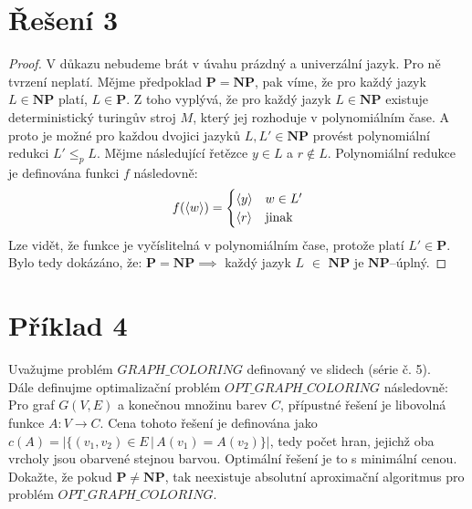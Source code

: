 \documentclass[a4paper, 11pt, fleqn]{scrartcl}
\begin{document}
 \section*{Řešení 3}
  \begin{proof}
    V důkazu nebudeme brát v úvahu prázdný a univerzální jazyk. Pro ně tvrzení neplatí. Mějme předpoklad $\mathbf{P} = \mathbf{NP}$, pak víme, že pro každý jazyk $L \in \mathbf{NP}$ platí, $L \in \mathbf{P}$. Z toho vyplývá, že pro každý jazyk $L \in \mathbf{NP}$ existuje deterministický turingův stroj $M$, který jej rozhoduje v polynomiálním čase. A proto je možné pro každou dvojici jazyků $L, L' \in \mathbf{NP}$ provést polynomiální redukci $L' \leq_p L$. Mějme následující řetězce $y \in L$ a $r \notin L$. Polynomiální redukce je definována funkci $f$ následovně:
    $$ f(\langle w \rangle) = \begin{cases}
                                \langle y \rangle & w \in L'\\
                                \langle r \rangle & \textnormal{jinak}
                              \end{cases} $$
    Lze vidět, že funkce je vyčíslitelná v polynomiálním čase, protože platí $L' \in \mathbf{P}$. Bylo tedy dokázáno, že: $\mathbf{P} = \mathbf{NP} \implies$ každý jazyk $L$ $\in$ $\mathbf{NP}$ je $\mathbf{NP}$--úplný.
  \end{proof}


 \section*{Příklad 4}
  Uvažujme problém $\mathit{GRAPH\_COLORING}$ definovaný ve slidech (série č. 5).\\

  Dále definujme optimalizační problém $\mathit{OPT\_GRAPH\_COLORING}$ následovně: Pro graf $G(V, E)$ a konečnou množinu barev $C$, přípustné řešení je libovolná funkce $A : V \rightarrow C$. Cena tohoto řešení je definována jako $c(A) = |\{(v_1 , v_2) \in E\, |\, A (v_1) = A(v_2)\}|$, tedy počet hran, jejichž oba vrcholy jsou obarvené stejnou barvou. Optimální řešení je to s minimální cenou. Dokažte, že pokud $\mathbf{P} \neq \mathbf{NP}$, tak neexistuje absolutní aproximační algoritmus pro problém $\mathit{OPT\_GRAPH\_COLORING}$.
\end{document}
